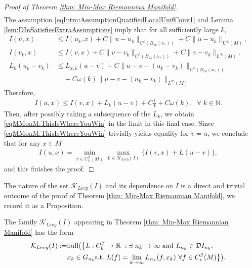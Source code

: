 \documentclass[11pt,reqno]{amsart}
\numberwithin{equation}{section}
\theoremstyle{plain}
\def\D{\mathcal D}
\def\K{\mathcal K}
\def\hull{\textnormal{hull}}
\begin{document}
\begin{proof}[Proof of Theorem \ref{thm: Min-Max Riemannian Manifold}]
\begin{align*}
\end{align*}
The assumption \eqref{eqIntro:AssumptionQuatifiedLocalUnifConv1} and Lemma \ref{lem:DInSatisfiesExtraAssumptions} imply that for all sufficiently large $k$,
\begin{align*}
  I(u,x) & \leq I(u_k,x) + C\|u-u_k \|_{C^\beta(B_{2k}(x_*))}+C\|u-u_k\|_{L^\infty(M)},\\
  I(v_k,x) & \leq I(v,x) + C\|v-v_k \|_{C^\beta(B_{2k}(x_*))}+C\|v-v_k\|_{L^\infty(M)},\\
  L_{k}(u_k-v_k) & \leq L_{x,k}(u-v) +C\|u-v-(u_k-v_k)\|_{C^\beta(B_{2k}(x_*))} \\
  & \;\;\;\;+C\omega(k)\|u-v-(u_k-v_k)\|_{L^\infty(M)}
\end{align*}
Therefore, 
\begin{align*}
  I(u,x) \leq I(v,x) + L_{k}(u-v) + C\frac{1}{k}+C\omega(k),\;\;\forall\;k\in\mathbb{N}.
\end{align*}
Then, after possibly taking a subsequence of the $L_k$, we obtain \eqref{eqMMonM:ThisIsWhereYouWin} in the limit in this final case. Since \eqref{eqMMonM:ThisIsWhereYouWin} trivially yields equality for $v=u$, we conclude that for any $x\in M$
\begin{align*}
  I(u,x) = \min\limits_{v\in C_b^\beta(M)} \max \limits_{L \in \K_{Levy}(I)} \{  I(v,x) +  L(u-v)\},
\end{align*}
and this finishes the proof.

\end{proof}

The nature of the set $\K_{Levy}(I)$ and its dependence on $I$ is a direct and trivial outcome of the proof of Theorem \ref{thm: Min-Max Riemannian Manifold}, we record it as a Proposition.

\begin{prop}\label{prop:ReduceMinMaxToWeakLimitsOfDIn}
  The family $\K_{Levy}(I)$ appearing in Theorem \ref{thm: Min-Max Riemannian Manifold} has the form
  \begin{align*}
    \K_{Levy}(I) := &\hull\big( \big\{L:C^\beta_b \to \mathbb{R}\ : \exists \ n_k \to \infty \textnormal{ and } L_{n_k}\in \D I_{n_k},\\ 
		&   x_{k} \in G_{n_k} \text{s.t.}\ L(f) = \lim_{k\to\infty} L_{n_k}(f,x_k)\ \forall f\in C^\beta_c(M) \big\}   \big).
  \end{align*}
\end{prop}
\end{document}
